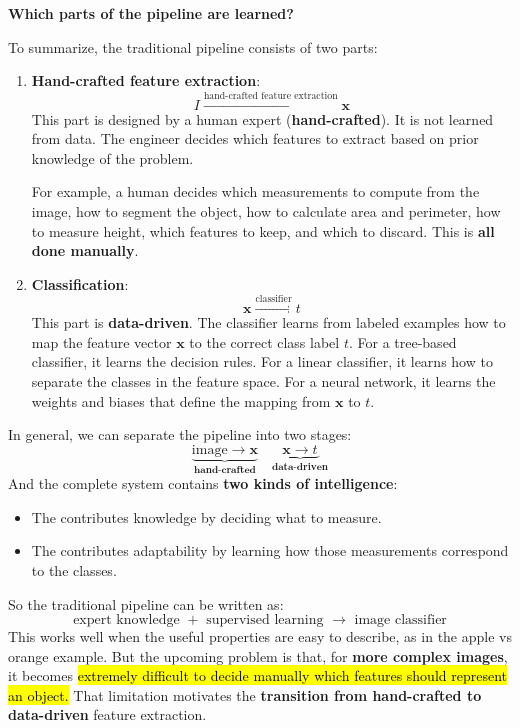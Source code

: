 \highspace
\begin{flushleft}
    \textcolor{Green3}{ \textbf{Which parts of the pipeline are learned?}}
\end{flushleft}
To summarize, the traditional pipeline consists of two parts:
\begin{enumerate}
    \item \textbf{Hand-crafted feature extraction}:
    \begin{equation*}
        I \xrightarrow{\text{hand-crafted feature extraction}} \mathbf{x}
    \end{equation*}
    This part is designed by a human expert (\textbf{hand-crafted}). It is not learned from data. The engineer decides which features to extract based on prior knowledge of the problem.
    
    For example, a human decides which measurements to compute from the image, how to segment the object, how to calculate area and perimeter, how to measure height, which features to keep, and which to discard. This is \textbf{all done manually}.

    
    \item \textbf{Classification}:
    \begin{equation*}
        \mathbf{x} \xrightarrow{\text{classifier}} t
    \end{equation*}
    This part is \textbf{data-driven}. The classifier learns from labeled examples how to map the feature vector $\mathbf{x}$ to the correct class label $t$. For a tree-based classifier, it learns the decision rules. For a linear classifier, it learns how to separate the classes in the feature space. For a neural network, it learns the weights and biases that define the mapping from $\mathbf{x}$ to $t$.
\end{enumerate}
In general, we can separate the pipeline into two stages:
\begin{equation*}
    \underbrace{\text{image} \to \mathbf{x}}_{\textbf{hand-crafted}} \quad \underbrace{\mathbf{x} \to t}_{\textbf{data-driven}}
\end{equation*}
And the complete system contains \textbf{two kinds of intelligence}:
\begin{itemize}
    \item The  contributes knowledge by deciding what to measure.
    \item The  contributes adaptability by learning how those measurements correspond to the classes.
\end{itemize}
So the traditional pipeline can be written as:
\begin{equation*}
    \text{expert knowledge } + \text{ supervised learning } \to \text{ image classifier}
\end{equation*}
This works well when the useful properties are easy to describe, as in the apple vs orange example. But the upcoming problem is that, for \textbf{more complex images}, it becomes \hl{extremely difficult to decide manually which features should represent an object.} That limitation motivates the \textbf{transition from hand-crafted to data-driven} feature extraction.

